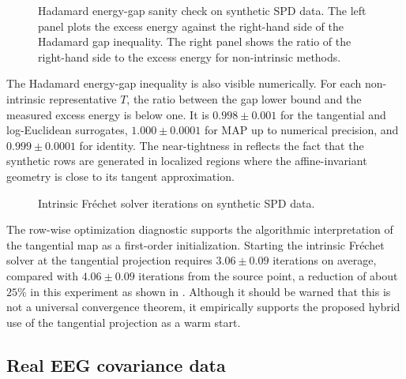 \documentclass[10pt]{article} %
\theoremstyle{definition}
\providecommand{\1}{\mathbf{1}}
\begin{document}
\begin{figure}[t]
\centering
\resizebox{0.98\linewidth}{!}{%
	
}
\caption{Hadamard energy-gap sanity check on synthetic SPD data. The left panel plots the excess energy against the right-hand side of the Hadamard gap inequality. The right panel shows the ratio of the right-hand side to the excess energy for non-intrinsic methods.}
\label{fig:spd-gap}
\end{figure}

The Hadamard energy-gap inequality is also visible numerically. For each non-intrinsic representative $T$, the ratio between the gap lower bound and the measured excess energy is below one. It is $0.998\pm0.001$ for the tangential and log-Euclidean surrogates, $1.000\pm0.0001$ for MAP up to numerical precision, and $0.999\pm0.0001$ for identity. The near-tightness in  reflects the fact that the synthetic rows are generated in localized regions where the affine-invariant geometry is close to its tangent approximation.

\begin{figure}[t]
\centering
\resizebox{0.58\linewidth}{!}{%
	
}
\caption{Intrinsic Fr\'echet solver iterations on synthetic SPD data. }
\label{fig:spd-iterations}
\end{figure}

The row-wise optimization diagnostic supports the algorithmic interpretation of the tangential map as a first-order initialization. Starting the intrinsic Fr\'echet solver at the tangential projection requires $3.06\pm0.09$ iterations on average, compared with $4.06\pm0.09$ iterations from the source point, a reduction of about $25\%$ in this experiment as shown in . Although it should be warned that this is not a universal convergence theorem, it empirically supports the proposed hybrid use of the tangential projection as a warm start.


\subsection{Real EEG covariance data}
\end{document}
